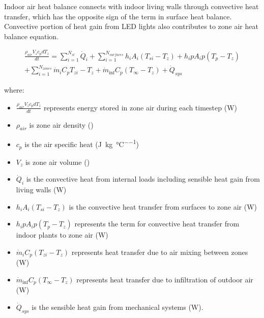 Indoor air heat balance connects with indoor living walls through convective heat transfer, which has the opposite sign of the term in surface heat balance. Convective portion of heat gain from LED lights also contributes to zone air heat balance equation.

\begin{equation}
\begin{array}{l}\frac{{\rho_{air}}{V_z}{c_p}{dT_z}}{dt} = \sum\limits_{i = 1}^{{N_{sl}}} {\dot Q_i^{}}  + \sum\limits_{i = 1}^{{N_{surfaces}}} {{h_i}} {A_i} ({{T_{si}} - {T_z}}) + {{h_ip}}{A_ip}({{T_{p}} - {T_z}})\\ + \sum\limits_{i = 1}^{{N_{zones}}} {{{\dot m}_i}} {C_p}{{T_{zi}} - {T_z}} + {\dot m_{\inf }}{C_p}( {{T_\infty } - {T_z}}) +{\dot Q_{sys}}\end{array}
\end{equation}

where:

\begin{itemize}
\tightlist
\item
  $\frac{\rho_{air} V_z c_p dT_z}{dt}$ represents energy stored in zone air during each timestep (\si{\watt})
\item
  $\rho_{air}$ is zone air density (\si{\density})
\item
  $c_p$ is the air specific heat (\si{\J\per\kg\per\celsius})
\item
  $V_z$ is zone air volume (\si{\volume})
\item
  \(\dot Q_i\) is the convective heat from internal loads including sensible heat gain from living walls (\si{\watt})
\item
  \({{h_i}} {A_i}\left( {{T_{si}} - {T_z}} \right)\) is the convective heat transfer from surfaces to zone air (\si{\watt})
\item
  \({{h_ip}} {A_ip}\left( {{T_{p}} - {T_z}} \right)\) represents the term for convective heat transfer from indoor plants to zone air (\si{\watt})
\item
  \({{{\dot m}_i}} {C_p}\left( {{T_{zi}} - {T_z}} \right)\) represents heat transfer due to air mixing between zones (\si{\watt})
\item
  \({\dot m_{\inf }}{C_p}\left( {{T_\infty } - {T_z}} \right)\) represents heat transfer due to infiltration of outdoor air (\si{\watt})
\item
  \(\dot Q_{sys}\) is the sensible heat gain from mechanical systems (\si{\watt}).
\end{itemize}

